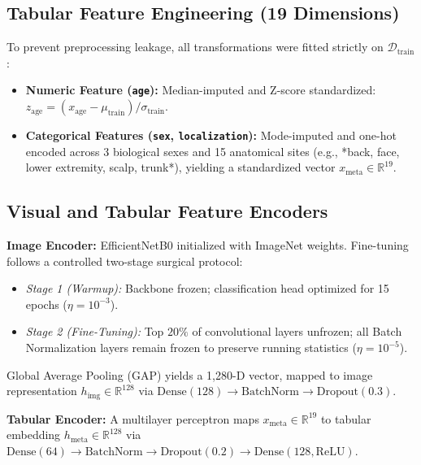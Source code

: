 \documentclass[journal,10pt,twocolumn]{IEEEtran}
\begin{document}
\subsection{Tabular Feature Engineering (19 Dimensions)}
To prevent preprocessing leakage, all transformations were fitted strictly on $\mathcal{D}_{\text{train}}$:
\begin{itemize}
    \item \textbf{Numeric Feature (\texttt{age}):} Median-imputed and Z-score standardized: $z_{\text{age}} = (x_{\text{age}} - \mu_{\text{train}}) / \sigma_{\text{train}}$.
    \item \textbf{Categorical Features (\texttt{sex}, \texttt{localization}):} Mode-imputed and one-hot encoded across 3 biological sexes and 15 anatomical sites (e.g., *back, face, lower extremity, scalp, trunk*), yielding a standardized vector $x_{\text{meta}} \in \mathbb{R}^{19}$.
\end{itemize}

\subsection{Visual and Tabular Feature Encoders}
\textbf{Image Encoder:} EfficientNetB0 \cite{tan2019efficientnet} initialized with ImageNet weights. Fine-tuning follows a controlled two-stage surgical protocol:
\begin{itemize}
    \item \textit{Stage 1 (Warmup):} Backbone frozen; classification head optimized for 15 epochs ($\eta = 10^{-3}$).
    \item \textit{Stage 2 (Fine-Tuning):} Top $20\%$ of convolutional layers unfrozen; all Batch Normalization layers remain frozen to preserve running statistics ($\eta = 10^{-5}$).
\end{itemize}
Global Average Pooling (GAP) yields a 1,280-D vector, mapped to image representation $h_{\text{img}} \in \mathbb{R}^{128}$ via $\text{Dense}(128) \to \text{BatchNorm} \to \text{Dropout}(0.3)$.

\textbf{Tabular Encoder:} A multilayer perceptron maps $x_{\text{meta}} \in \mathbb{R}^{19}$ to tabular embedding $h_{\text{meta}} \in \mathbb{R}^{128}$ via $\text{Dense}(64) \to \text{BatchNorm} \to \text{Dropout}(0.2) \to \text{Dense}(128, \text{ReLU})$.
\end{document}
